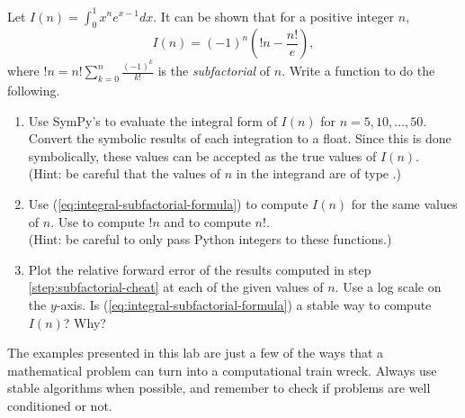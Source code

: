 \begin{problem}
Let $I(n) = \int_0^1 x^n e^{x - 1} dx$.
It can be shown that for a positive integer $n$,
\begin{equation}
I(n) = (-1)^n(!n - \frac{n!}{e}),
\label{eq:integral-subfactorial-formula}
\end{equation}
where $!n=n!\sum_{k=0}^{n} \frac{(-1)^k}{k!}$ is the \emph{subfactorial} of $n$.
Write a function to do the following.
\begin{enumerate}
\item Use SymPy's  to evaluate the integral form of $I(n)$ for $n=5,10,\ldots,50$.
Convert the symbolic results of each integration to a float.
Since this is done symbolically, these values can be accepted as the true values of $I(n)$.
\\(Hint: be careful that the values of $n$ in the integrand are of type .)

\item Use (\ref{eq:integral-subfactorial-formula}) to compute $I(n)$ for the same values of $n$.
Use  to compute $!n$ and  to compute $n!$.
\\(Hint: be careful to only pass Python integers to these functions.)
\label{step:subfactorial-cheat}

\item Plot the relative forward error of the results computed in step \ref{step:subfactorial-cheat} at each of the given values of $n$.
Use a log scale on the $y$-axis.
Is (\ref{eq:integral-subfactorial-formula}) a stable way to compute $I(n)$?
Why?
\end{enumerate}
\end{problem}

The examples presented in this lab are just a few of the ways that a mathematical problem can turn into a computational train wreck.
Always use stable algorithms when possible, and remember to check if problems are well conditioned or not.

